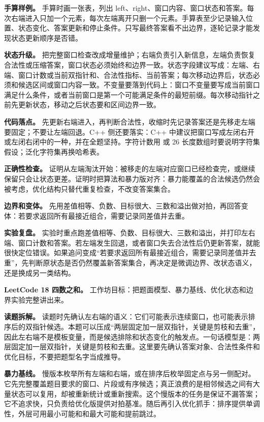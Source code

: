 \textbf{手算样例。} 手算时画一张表，列出 left、right、窗口内容、窗口状态和答案。每次右端进入只加一个元素，每次左端离开只删一个元素。手算表至少记录输入位置、状态变化、答案更新和停止条件。只写最终答案看不出边界，逐轮记录才能发现状态更新顺序是否错。

\textbf{状态升级。} 把完整窗口检查改成增量维护；右端负责引入新信息，左端负责恢复合法性或压缩答案，窗口状态必须始终和边界一致。状态字段建议写成：左端、右端、窗口计数或当前双指针和、合法性指标、当前答案；每次移动边界后，状态必须和候选区间或窗口内容一致。不变量要落到代码上：窗口不变量要写成当前窗口满足什么条件，或者当前窗口是第一个可能满足条件的最短前缀。每次移动指针之前先更新状态，移动之后状态要和区间边界一致。

\textbf{代码落点。} 先更新右端进入，再判断合法性，收缩时先记录答案还是先移走左端要固定；不要让左端回退。C++ 侧还要落实：C++ 中建议把窗口写成左闭右开或左闭右闭中的一种，并在全题坚持。字符计数用  或 26 长度数组时要说明字符集假设；泛化字符集再换哈希表。

\textbf{正确性检查。} 证明从左端淘汰开始：被移走的左端对应窗口已经检查完，或继续保留只会让状态更差。证明时把算法和暴力版对齐：暴力能覆盖的合法候选仍然会被考虑，优化结构只替代重复检查，不改变答案集合。

\textbf{边界和变体。} 先用差值相等、负数、目标很大、三数和溢出做对拍，再回答变体：若要求返回所有最接近组合，需要记录同差值并去重。

\textbf{实验复盘。} 实验时重点跑差值相等、负数、目标很大、三数和溢出，并打印左右端、窗口计数和答案。若左端发生回退，或者窗口失去合法性后仍更新答案，就能很快定位错误。如果追问变成“若要求返回所有最接近组合，需要记录同差值并去重”，先判断原状态是否仍然覆盖新答案集合，再决定是微调边界、改状态语义，还是换成另一类结构。

\noindent\textbf{LeetCode 18 四数之和。} 工作坊目标：把题面模型、暴力基线、优化状态和边界实验完整讲出来。

\textbf{读题拆解。} 读题时先确认左右端的语义：它们可能表示连续窗口，也可能表示排序后的双指针候选。本题可以压成“两层固定加一层双指针，关键是剪枝和去重”，因此左右端不是模板变量，而是候选排除和状态变化的触发点。一句话模型是：两层固定加一层双指针，关键是剪枝和去重。这里要先确认答案对象、合法性条件和优化目标，不要把题型名字当成推导。

\textbf{暴力基线。} 慢版本枚举所有左端和右端，或在排序后枚举固定点与另一侧配对。它先完整覆盖题目要求的窗口、片段或有序候选；真正浪费的是相邻候选之间有大量状态可以复用，却被重新统计或重新搜索。这个慢版本的任务是保证不漏答案；它不追求快，只负责给优化版提供对拍基准。随后再引入优化抓手：排序提供单调性，外层可用最小可能和和最大可能和提前跳过。

